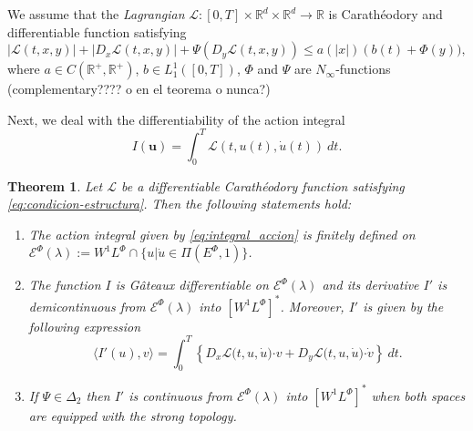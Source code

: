 \documentclass[twoside]{article}
\newtheorem{thm}{Theorem}[section]
\theoremstyle{remark}
\newcommand{\lphi}{L^{\Phi}}
\newcommand{\ephi}{E^{\Phi}}
\newcommand{\wphi}{W^{1}\lphi}
\newcommand{\domi}{\mathcal{E}^{\Phi}(\lambda)}
\renewcommand{\b}[1]{\boldsymbol{#1}}
\newcommand{\rr}{\mathbb{R}}
\newcommand{\ccdot}{\b{\cdot}}
\renewcommand{\leq}{\leqslant}
\begin{document}
We assume that the \emph{Lagrangian} $\mathcal{L}:[0,T]\times\rr^d\times\rr^d\to\rr$ is 
Carath\'eodory and differentiable function satisfying 
\begin{equation}\label{eq:condicion-estructura}
|\mathcal{L}(t,x,y)|+ |D_{x}\mathcal{L}(t,x,y)|+\Psi(D_{y}\mathcal{L}(t,x,y))
\leq
a(|x|)\left(b(t)+ \Phi(y)),
\end{equation}
where  $a\in C(\mathbb{R}^+,\mathbb{R}^+)$, $b\in L^1_1([0,T]) $, $\Phi$ and $\Psi$ are $N_{\infty}$-functions (complementary???? o en el teorema o nunca?)

Next, we deal with the differentiability of the action integral 
\begin{equation}\label{eq:integral_accion}
I(\b{u})=\int_{0}^T \mathcal{L}(t,u(t),\dot{u}(t))\ dt.
\end{equation}


\begin{thm}\label{teo:diferenciabilidad}
Let $\mathcal{L}$ be a differentiable Carath\'eodory function satisfying \eqref{eq:condicion-estructura}.
Then the following statements hold:
\begin{enumerate}
\item \label{it:T1item1} \label{A1} The action integral given by \eqref{eq:integral_accion}
is finitely defined on $\domi:=W^{1}\lphi\cap\{u|\dot{u}\in\Pi(\ephi,1)\}$.

\item\label{it:T1item3} The function  $I$ is G\^ateaux differentiable on $\domi$ and  its derivative $I'$ is demicontinuous from 
$\domi$  into $\left[\wphi \right]^*$. Moreover, $I'$ is given by the following expression
\begin{equation}\label{eq:DerAccion}
\langle  I'(u),v\rangle= \int_0^T \left\{D_{x}\mathcal{L}\big(t,u,\dot{u}\big)\ccdot v
+ D_{y}\mathcal{L}\big(t,u,\dot{u}\big)\ccdot\dot{v}\right\} \ dt.
\end{equation}

\item\label{T1item4}  If  $\Psi \in \Delta_2$ then 
  $I'$ is continuous from $\domi$ into $\left[\wphi\right]^*$ when both spaces are equipped with the strong topology.
\end{enumerate}
\end{thm}
\end{document}
